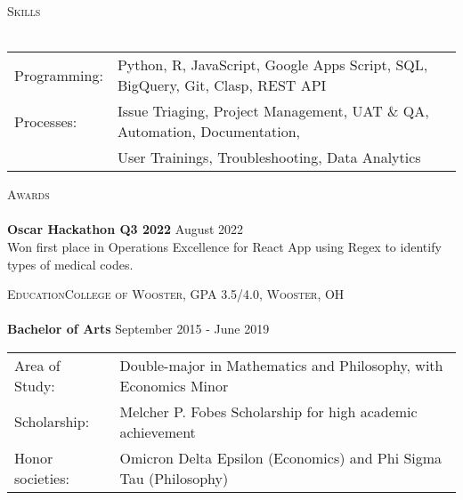 \documentclass[a4paper]{article}
\newcommand{\lineunder} {
    \vspace*{-8pt} \\
    \hspace*{-18pt} \hrulefill \\
}
\newcommand{\header} [1] {
    {\hspace*{-18pt}\vspace*{6pt} \textsc{#1}}
    \vspace*{-6pt} \lineunder
}
\begin{document}
\header{Skills}
\begin{tabular}{ l l }
	Programming:    &   Python, R, JavaScript, Google Apps Script, SQL, BigQuery, Git, Clasp, REST API\\
    Processes:      &   Issue Triaging, Project Management, UAT \& QA, Automation, Documentation,\\ 
                    &   User Trainings, Troubleshooting,  Data Analytics
\end{tabular}
\vspace{2mm}


\header{Awards}
\textbf{Oscar Hackathon Q3 2022} \hfill August 2022\\
Won first place in Operations Excellence for React App using Regex to identify types of medical codes. 
\vspace*{2mm}

\header{Education\hfill College of Wooster, GPA 3.5/4.0, Wooster, OH}
\textbf{Bachelor of Arts} \hfill September 2015 - June 2019\\

\begin{tabular}{ l| l }
    Area of Study:& Double-major in Mathematics and Philosophy, with Economics Minor\\
    Scholarship:& Melcher P. Fobes Scholarship for high academic achievement\\
    Honor societies:& Omicron Delta Epsilon (Economics) and Phi Sigma Tau (Philosophy)

\end{tabular}

\vspace*{2mm}
\ 
\end{document}
